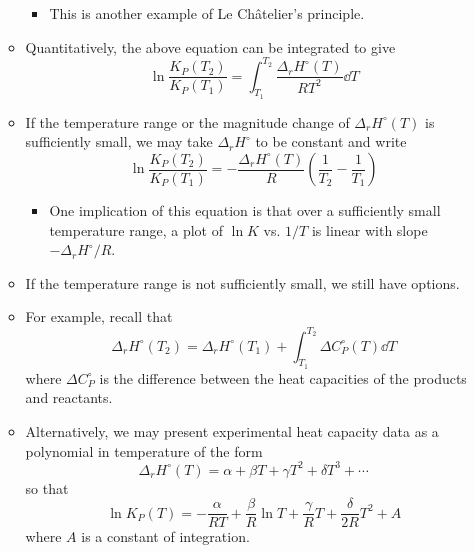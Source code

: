 \documentclass[../notes.tex]{subfiles}
\begin{document}
\begin{itemize}
\begin{itemize}
        \begin{itemize}
            \item This is another example of Le Ch\^{a}telier's principle.
        \end{itemize}
        \item Quantitatively, the above equation can be integrated to give
        \begin{equation*}
            \ln\frac{K_P(T_2)}{K_P(T_1)} = \int_{T_1}^{T_2}\frac{\Delta_rH^\circ(T)}{RT^2}\dd{T}
        \end{equation*}
        \item If the temperature range or the magnitude change of $\Delta_rH^\circ(T)$ is sufficiently small, we may take $\Delta_rH^\circ$ to be constant and write
        \begin{equation*}
            \ln\frac{K_P(T_2)}{K_P(T_1)} = -\frac{\Delta_rH^\circ(T)}{R}\left( \frac{1}{T_2}-\frac{1}{T_1} \right)
        \end{equation*}
        \begin{itemize}
            \item One implication of this equation is that over a sufficiently small temperature range, a plot of $\ln K$ vs. $1/T$ is linear with slope $-\Delta_rH^\circ/R$.
        \end{itemize}
        \item If the temperature range is not sufficiently small, we still have options.
        \item For example, recall that
        \begin{equation*}
            \Delta_rH^\circ(T_2) = \Delta_rH^\circ(T_1)+\int_{T_1}^{T_2}\Delta C_P^\circ(T)\dd{T}
        \end{equation*}
        where $\Delta C_P^\circ$ is the difference between the heat capacities of the products and reactants.
        \item Alternatively, we may present experimental heat capacity data as a polynomial in temperature of the form
        \begin{equation*}
            \Delta_rH^\circ(T) = \alpha+\beta T+\gamma T^2+\delta T^3+\cdots
        \end{equation*}
        so that
        \begin{equation*}
            \ln K_P(T) = -\frac{\alpha}{RT}+\frac{\beta}{R}\ln T+\frac{\gamma}{R}T+\frac{\delta}{2R}T^2+A
        \end{equation*}
        where $A$ is a constant of integration.
        \begin{itemize}

\end{itemize}
\end{itemize}
\end{itemize}
\end{document}
